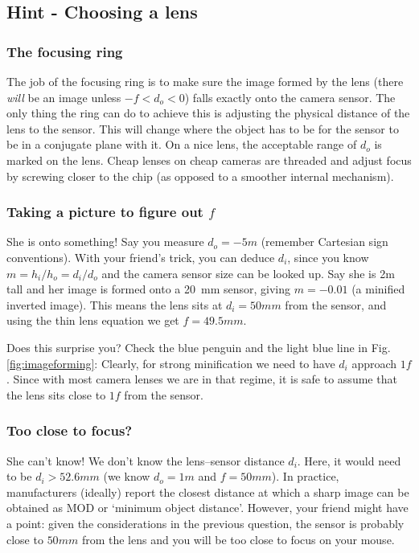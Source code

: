 \documentclass[a4paper]{report}
\begin{document}
	\clearpage


    \subsection{Hint - Choosing a lens}
	\hypertarget{hintTo-buying}{}

	\subsubsection{The focusing ring}
	The job of the focusing ring is to make sure the image formed by the lens (there \emph{will} be an image unless $-f<d_o<0$) falls exactly onto the camera sensor.
	The only thing the ring can do to achieve this is adjusting the physical distance of the lens to the sensor. This will change where the object has to be for the sensor to be in a conjugate plane with it. On a nice lens, the acceptable range of $d_o$ is marked on the lens.
	Cheap lenses on cheap cameras are threaded and adjust focus by screwing closer to the chip (as opposed to a smoother internal mechanism).


	\subsubsection{Taking a picture to figure out $f$}
	She is onto something! Say you measure $d_o=-5m$ (remember Cartesian sign conventions).
	With your friend's trick, you can deduce $d_i$, since you know $m=h_i/h_o=d_i/d_o$ and the camera sensor size can be looked up.
	Say she is 2m tall and her image is formed onto a 20~mm sensor, giving $m=-0.01$ (a minified inverted image).
	This means the lens sits at $d_i=50mm$ from the sensor, and using the thin lens equation we get $f=49.5mm$.

	Does this surprise you?
	Check the blue penguin and the light blue line in Fig. \ref{fig:imageforming}: Clearly, for strong minification we need to have $d_i$ approach $1f$.
	Since with most camera lenses we are in that regime, it is safe to assume that the lens sits close to $1f$ from the sensor.

	\subsubsection{Too close to focus?}
	She can't know! We don't know the lens--sensor distance $d_i$.
	Here, it would need to be $d_i>52.6mm$ (we know $d_o=1m$ and $f=50mm$).
	In practice, manufacturers (ideally) report the closest distance at which a sharp image can be obtained as MOD or `minimum object distance'.
	However, your friend might have a point: given the considerations in the previous question, the sensor is probably close to $50mm$ from the lens and you will be too close to focus on your mouse.
\end{document}
